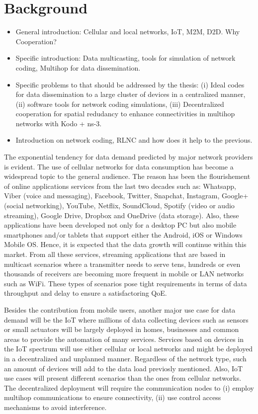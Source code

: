 \section{Background}\label{sec:background}

\begin{itemize}
\item General introduction: Cellular and local networks, \ac{IoT}, \ac{M2M}, \ac{D2D}. Why Cooperation?
\item Specific introduction: Data multicasting, tools for simulation of network coding, Multihop for data dissemination.
\item Specific problems to that should be addressed by the thesis: (i) Ideal codes for data dissemination to a large cluster of devices in a centralized manner, (ii) software tools for network coding simulations, (iii) Decentralized cooperation for spatial redudancy to enhance connectivities in multihop networks with Kodo + ns-3.
\item Introduction on network coding, RLNC and how does it help to the previous.
\end{itemize}

The exponential tendency for data demand predicted by major network providers \cite{cisco2016forecast} is evident. The use of cellular networks for data consumption has become a widespread topic to the general audience. The reason has been the flourishement of online applications services from the last two decades such as:  Whatsapp, Viber (voice and messaging), Facebook, Twitter, Snapchat, Instagram, Google+ (social networking), YouTube, Netflix, SoundCloud, Spotify (video or audio streaming), Google Drive, Dropbox and OneDrive (data storage). Also, these applications have been developed not only for a desktop \ac{PC} but also mobile smartphones and/or tablets that support either the Android, iOS or Windows Mobile \ac{OS}. Hence, it is expected that the data growth will continue within this market. From all these services, streaming applications that are based in multicast scenarios where a transmitter needs to serve tens, hundreds or even thousands of receivers are becoming more frequent in mobile or \ac{LAN} networks such as \ac{WiFi}. These types of scenarios pose tight requirements in terms of data throughput and delay to ensure a satisfactoring \ac{QoE}.



Besides the contribution from mobile users, another major use case for data demand will be the \ac{IoT} where millions of data collecting devices such as sensors or small actuators will be largely deployed in homes, businesses and common areas to provide the automation of many services. Services based on devices in the \ac{IoT} spectrum will use either cellular or local networks and might be deployed in a decentralized and unplanned manner. Regardless of the network type, such an amount of devices will add to the data load previosly mentioned. Also, \ac{IoT} use cases will present different scenarios than the ones from cellular networks. The decentralized deployment will require the communication nodes to (i) employ multihop communications to ensure connectivity, (ii) use control access mechanisms to avoid interference.

